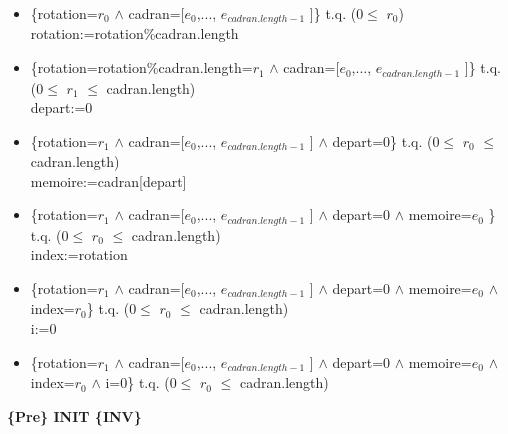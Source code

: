 \documentclass[a4paper, 12pt]{article}
\begin{document}
\begin{itemize}
\item \{rotation=$r_{0}$ $\wedge$ cadran=[$e_{0}$,..., $e_{cadran.length-1}$ ]\} t.q. (0$\le$ $r_{0}$)\\

rotation:=rotation\%cadran.length\\

\item \{rotation=rotation\%cadran.length=$r_{1}$ $\wedge$ cadran=[$e_{0}$,..., $e_{cadran.length-1}$ ]\} t.q. (0$\le$ $r_{1}$ $\le$ cadran.length)\\ 

depart:=0\\

\item \{rotation=$r_{1}$ $\wedge$ cadran=[$e_{0}$,..., $e_{cadran.length-1}$ ] $\wedge$ depart=0\} t.q. (0$\le$ $r_{0}$ $\le$ cadran.length)\\

memoire:=cadran[depart]\\

\item \{rotation=$r_{1}$ $\wedge$ cadran=[$e_{0}$,..., $e_{cadran.length-1}$ ] $\wedge$ depart=0 $\wedge$ memoire=$e_{0}$ \} t.q. (0$\le$ $r_{0}$ $\le$ cadran.length)\\

index:=rotation

\item \{rotation=$r_{1}$ $\wedge$ cadran=[$e_{0}$,..., $e_{cadran.length-1}$ ] $\wedge$ depart=0 $\wedge$ memoire=$e_{0}$ $\wedge$ index=$r_{0}$\} t.q. (0$\le$ $r_{0}$ $\le$ cadran.length)\\

i:=0\\

\item \{rotation=$r_{1}$ $\wedge$ cadran=[$e_{0}$,..., $e_{cadran.length-1}$ ] $\wedge$ depart=0 $\wedge$ memoire=$e_{0}$ $\wedge$ index=$r_{0}$ $\wedge$ i=0\} t.q. (0$\le$ $r_{0}$ $\le$ cadran.length)\\
\end{itemize}

\textbf{\{Pre\} INIT \{INV\}}
\end{document}
